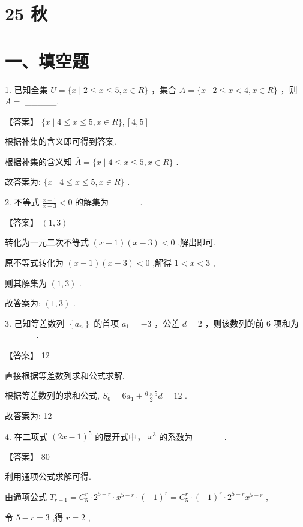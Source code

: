 \documentclass[10pt]{article}
\begin{document}
\section*{25 秋}

\section*{一、填空题}

1. 已知全集 \(U = \{ x \mid  2 \leq  x \leq  5,x \in  R\}\) ，集合 \(A = \{ x \mid  2 \leq  x < 4,x \in  R\}\) ，则 \(\bar{A} =\) \_\_\_\_\_.

【答案】 \(\{ x \mid  4 \leq  x \leq  5,x \in  R\} ,\left\lbrack  {4,5}\right\rbrack\)

根据补集的含义即可得到答案.

根据补集的含义知 \(\bar{A} = \{ x \mid  4 \leq  x \leq  5,x \in  R\}\) .

故答案为: \(\{ x \mid  4 \leq  x \leq  5,x \in  R\}\) .

2. 不等式 \(\frac{x - 1}{x - 3} < 0\) 的解集为\_\_\_\_\_.

【答案】 \(\left( {1,3}\right)\)

转化为一元二次不等式 \(\left( {x - 1}\right) \left( {x - 3}\right)  < 0\) ,解出即可.

原不等式转化为 \(\left( {x - 1}\right) \left( {x - 3}\right)  < 0\) ,解得 \(1 < x < 3\) ,

则其解集为 \(\left( {1,3}\right)\) .

故答案为: \(\left( {1,3}\right)\) .

3. 己知等差数列 \(\left\{  {a}_{n}\right\}\) 的首项 \({a}_{1} =  - 3\) ，公差 \(d = 2\) ，则该数列的前 6 项和为\_\_\_\_\_.

【答案】 12

直接根据等差数列求和公式求解.

根据等差数列的求和公式, \({S}_{6} = 6{a}_{1} + \frac{6 \times  5}{2}d = {12}\) .

故答案为: 12

4. 在二项式 \({\left( 2x - 1\right) }^{5}\) 的展开式中， \({x}^{3}\) 的系数为\_\_\_\_\_.

【答案】 80

利用通项公式求解可得.

由通项公式 \({T}_{r + 1} = {C}_{5}^{r} \cdot  {2}^{5 - r} \cdot  {x}^{5 - r} \cdot  {\left( -1\right) }^{r} = {C}_{5}^{r} \cdot  {\left( -1\right) }^{r} \cdot  {2}^{5 - r}{x}^{5 - r}\) ,

令 \(5 - r = 3\) ,得 \(r = 2\) ,
\end{document}
